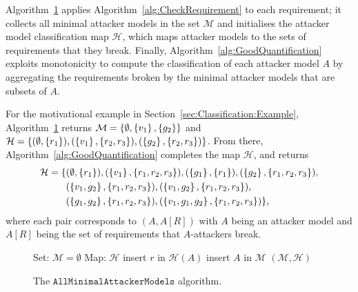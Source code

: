 Algorithm~\ref{alg:MinimalAttackerModels} applies Algorithm~\ref{alg:CheckRequirement} to each requirement; it collects all minimal attacker models in the set $\mathcal{M}$ and initialises the attacker model classification map $\mathcal{H}$, which maps attacker models to the sets of requirements that they break. Finally, Algorithm~\ref{alg:GoodQuantification} exploits monotonicity to compute the classification of each attacker model $A$ by aggregating the requirements broken by the minimal attacker models that are subsets of $A$.

\begin{example}
For the motivational example in Section~\ref{sec:Classification:Example}, Algorithm~\ref{alg:MinimalAttackerModels} returns $\mathcal{M}=\left\{\emptyset,\left\{v_1\right\}, \left\{g_2\right\}\right\}$ and $\mathcal{H}=\left\{(\emptyset,\left\{r_1\right\}), (\left\{v_1\right\},\left\{r_2, r_3\right\}),  (\left\{g_2\right\},\left\{r_2, r_3\right\})\right\}$. From there,  Algorithm~\ref{alg:GoodQuantification} completes the map $\mathcal{H}$, and returns
\begin{align*}
\mathcal{H}=\{&(\emptyset,\left\{r_1\right\}), (\left\{v_1\right\},\left\{r_1,r_2, r_3\right\}),  (\left\{g_1\right\},\left\{r_1\right\}),(\left\{g_2\right\},\left\{r_1,r_2, r_3\right\}), \\
&(\left\{v_1,g_2\right\},\left\{r_1,r_2, r_3\right\}),(\left\{v_1,g_2\right\},\left\{r_1,r_2, r_3\right\}),\\
&(\left\{g_1,g_2\right\},\left\{r_1,r_2, r_3\right\}),(\left\{v_1,g_1,g_2\right\},\left\{r_1,r_2, r_3\right\})\},
\end{align*}
where each pair corresponds to $(A,A[R])$ with $A$ being an attacker model and $A[R]$ being the set of requirements that $A$-attackers break.
\end{example}

\begin{figure}[!t]
\centering
{
\begin{algorithm}[H]
Set: $\mathcal{M}=\emptyset$\;
Map: $\mathcal{H}$\;
	{
		{
			insert $r$ in $\mathcal{H}(A)$\;
			insert $A$ in $\mathcal{M}$\;
		}
	 }
 \Return $(\mathcal{M},\mathcal{H})$\;
 \caption{The $\mathtt{AllMinimalAttackerModels}$ algorithm. }
 \label{alg:MinimalAttackerModels}
\end{algorithm}}
\vspace{-0.5cm}
\end{figure}


